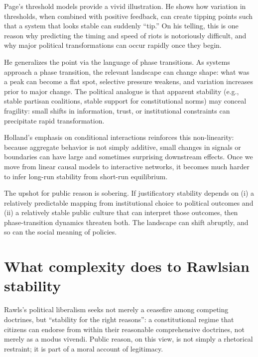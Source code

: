 \documentclass[12pt]{report}
\begin{document}
Page’s threshold models provide a vivid illustration. He shows how variation in thresholds, when combined with positive feedback, can create tipping points such that a system that looks stable can suddenly “tip.” \parencite[p.~162]{page2011diversity} On his telling, this is one reason why predicting the timing and speed of riots is notoriously difficult, and why major political transformations can occur rapidly once they begin. \parencite[pp.~162--163]{page2011diversity}

He generalizes the point via the language of phase transitions. As systems approach a phase transition, the relevant landscape can change shape: what was a peak can become a flat spot, selective pressure weakens, and variation increases prior to major change. \parencite[p.~163]{page2011diversity} The political analogue is that apparent stability (e.g., stable partisan coalitions, stable support for constitutional norms) may conceal fragility: small shifts in information, trust, or institutional constraints can precipitate rapid transformation.

Holland’s emphasis on conditional interactions reinforces this non-linearity: because aggregate behavior is not simply additive, small changes in signals or boundaries can have large and sometimes surprising downstream effects. \parencite[p.~2]{holland2012signals} Once we move from linear causal models to interactive networks, it becomes much harder to infer long-run stability from short-run equilibrium.

The upshot for public reason is sobering. If justificatory stability depends on (i) a relatively predictable mapping from institutional choice to political outcomes and (ii) a relatively stable public culture that can interpret those outcomes, then phase-transition dynamics threaten both. The landscape can shift abruptly, and so can the social meaning of policies.

\section{What complexity does to Rawlsian stability}

Rawls’s political liberalism seeks not merely a ceasefire among competing doctrines, but “stability for the right reasons”: a constitutional regime that citizens can endorse from within their reasonable comprehensive doctrines, not merely as a modus vivendi. \parencite[p.~459]{rawls2005political} Public reason, on this view, is not simply a rhetorical restraint; it is part of a moral account of legitimacy.
\end{document}
